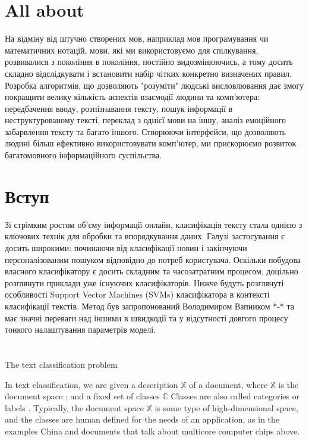 \section{All about}
На відміну від штучно створених мов, наприклад мов програмування чи математичних нотацій,
мови, які ми використовуємо для спілкування, розвивалися з покоління в покоління, постійно
видозмінюючись, а тому досить складно відслідкувати і встановити набір чітких конкретно
визначених правил. Розробка алгоритмів, що дозволяють "розуміти" людські висловлювання
дає змогу покращити велику кількість аспектів взаємодії людини та комп'ютера: передбачення
вводу, розпізнавання тексту, пошук інформації в неструктурованому тексті, переклад з однієї
мови на іншу, аналіз емоційного забарвлення тексту та багато іншого. Створюючи інтерфейси,
що дозволяють людині більш ефективно використовувати комп'ютер, ми прискорюємо
розвиток багатомовного інформаційного суспільства.

\section{Вступ}
Зі стрімким ростом об'єму інформації онлайн, класифікація тексту стала однією з ключових
технік для обробки та впорядкування даних. Галузі застосування є досить широкими:
починаючи від класифікації новин і закінчуючи персоналізованим пошуком відповідно до
потреб користувача. Оскільки побудова власного класифікатору є досить складним та
часозатратним процесом, доцільно розглянути приклади уже існуючих класифікаторів.
Нижче будуть розглянуті особливості  Support Vector Machines (SVMs) класифікатора в
контексті класифікації текстів. Метод був запропонований Володимиром Вапником *-* та
має значні переваги над іншими в швидкодії та у відсутності довгого процесу тонкого
налаштування параметрів моделі.

\section{}
The text classification problem

In text classification, we are given a description
$\mathbb{X}$ of a document, where $\mathbb{X}$ is the document space ; and a fixed set
of classes  $\mathbb{C}$ Classes are also called categories or
labels . Typically, the document space  $\mathbb{X}$ is some type of high-dimensional space,
and the classes are human defined for the needs of an application, as in the examples China
and documents that talk about multicore computer chips above.

